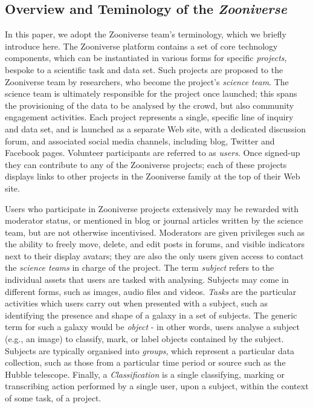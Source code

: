 \documentclass{sigchi}
\begin{document}
\subsection{Overview and Teminology of the \emph{Zooniverse}}
In this paper, we adopt the Zooniverse team's terminology, which we briefly introduce here. The Zooniverse platform contains a set of core technology components, which can be instantiated in various forms for specific \emph{projects}, bespoke to a scientific task and data set. Such projects are proposed to the Zooniverse team by researchers, who become the project's \emph{science team}.  The science team is ultimately responsible for the project once launched; this spans the provisioning of the data to be analysed by the crowd, but also community engagement activities. Each project represents a single, specific line of inquiry and data set, and is launched as a separate Web site, with a dedicated discussion forum,  and associated social media channels, including blog, Twitter and Facebook pages.  Volunteer participants are referred to as \emph{users}. Once signed-up they can contribute to any of the Zooniverse projects; each of these projects displays links to other projects in the Zooniverse family at the top of their Web site.

Users who participate in Zooniverse projects extensively may be rewarded with moderator status, or mentioned in blog or journal articles written by the science team, but are not otherwise incentivised.  Moderators are given privileges such as the ability to freely move, delete, and edit posts in forums, and visible indicators next to their display avatars; they are also the only users given access to contact the \emph{science teams} in charge of the project. The term \emph{subject} refers to the individual assets that users are tasked with analysing.  Subjects may come in different forms, such as images, audio files and videos. \emph{Tasks} are the particular activities which users carry out when presented with a subject, such as identifying the presence and shape of a galaxy in a set of subjects. The generic term for such a galaxy would be \emph{object} - in other words, users analyse a subject (e.g., an image) to classify, mark, or label objects contained by the subject. Subjects are typically organised into \emph{groups}, which represent a particular data collection, such as those from a particular time period or source such as the Hubble telescope.  Finally, a \emph{Classification} is a single classifying, marking or transcribing action performed by a single user, upon a subject, within the context of some task, of a project.
\end{document}
